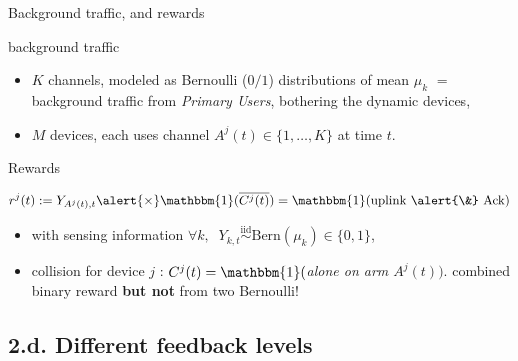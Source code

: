 \documentclass[12pt,english,ignorenonframetext,aspectratio=169,]{beamer}
\providecommand{\tightlist}{%
  \setlength{\itemsep}{0pt}\setlength{\parskip}{0pt}}
\begin{document}
\begin{frame}{Background traffic, and rewards}

\begin{block}{\iid{} background traffic}

\begin{itemize}
\tightlist
\item
  \(K\) channels, modeled as Bernoulli (\(0/1\)) distributions of mean
  \(\mu_k\) \(=\) background traffic from \emph{Primary Users},
  bothering the dynamic devices,
\item
  \(M\) devices, each uses channel \(A^j(t) \in \{1,\dots,K\}\) at time
  \(t\).
\end{itemize}

\end{block}

\begin{block}{Rewards}

\[r^j(t) := Y_{A^j(t),t} \alert{\times} \mathbbm{1}(\overline{C^j(t)}) = \mathbbm{1}(\text{uplink \alert{\&} Ack})\]

\begin{itemize}
\tightlist
\item
  with sensing information
  \(\forall k, \;\; Y_{k,t} \overset{\text{iid}}{\sim} \mathrm{Bern}(\mu_k) \in \{0, 1\}\),
\item
  collision for device \(j\) :
  \(C^j(t) = \mathbbm{1}(\)\emph{alone on arm $A^j(t)$}\()\).
  \hook \alert{combined} binary reward \textbf{but not} from two Bernoulli!
\end{itemize}

\end{block}

\end{frame}



\subsection{\hfill{}2.d. Different feedback levels\hfill{}}
\end{document}
